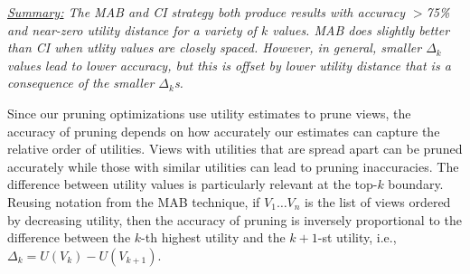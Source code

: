 {\em \underline{Summary:} The MAB and CI strategy both produce results with 
accuracy $>$75\% and near-zero utility distance for a variety of $k$ values.
MAB does slightly better than CI when utlity values are closely spaced.
However, in general, smaller $\Delta_k$ values lead to lower accuracy, but this is offset by
lower utility distance that is a consequence of the smaller $\Delta_k$s. 
}

\noindent Since our pruning optimizations use utility estimates to prune views, 
 the accuracy of pruning depends on how accurately
 our estimates can capture the relative order of utilities.
 Views with utilities that are spread apart can be pruned accurately while
 those with similar utilities can lead to pruning inaccuracies.
 The difference between utility values is particularly relevant at the top-$k$
 boundary.
 Reusing notation from the MAB technique, if $V_1 \ldots V_n$ is the list of views 
 ordered by decreasing utility, then the accuracy of pruning is inversely proportional to 
 the difference between the $k$-th highest utility and the $k+1$-st utility, 
 i.e., $\Delta_k = U(V_k) - U(V_{k+1})$.


